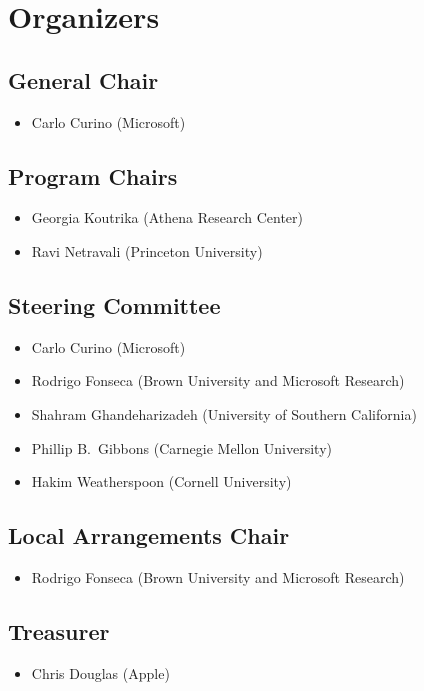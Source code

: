 \section*{Organizers}

\subsection*{General Chair}
\begin{itemize}
    \item[] Carlo Curino (Microsoft)
\end{itemize}
\subsection*{Program Chairs}
\begin{itemize}
    \item[] Georgia Koutrika (Athena Research Center)
    \item[] Ravi Netravali (Princeton University)
\end{itemize}

\subsection*{Steering Committee}
\begin{itemize}
    \item[] Carlo Curino (Microsoft)
    \item[] Rodrigo Fonseca (Brown University and Microsoft Research)
    \item[] Shahram Ghandeharizadeh (University of Southern California)
    \item[] Phillip B.\ Gibbons (Carnegie Mellon University)
    \item[] Hakim Weatherspoon (Cornell University)
\end{itemize}

\subsection*{Local Arrangements Chair}
\begin{itemize}
    \item[] Rodrigo Fonseca (Brown University and Microsoft Research)
\end{itemize}

\subsection*{Treasurer}
\begin{itemize}
    \item[] Chris Douglas (Apple)
\end{itemize}

